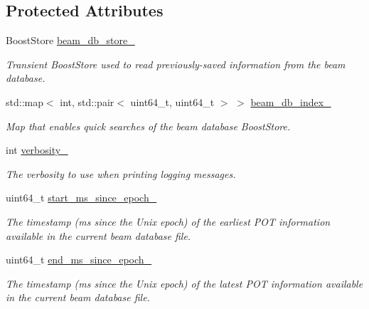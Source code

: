 \subsection*{Protected Attributes}
\begin{DoxyCompactItemize}
\item 
\hypertarget{classBeamChecker_a2b910738f1f07819ce8cf564bff685d0}{
BoostStore \hyperlink{classBeamChecker_a2b910738f1f07819ce8cf564bff685d0}{beam\_\-db\_\-store\_\-}}
\label{classBeamChecker_a2b910738f1f07819ce8cf564bff685d0}

\begin{DoxyCompactList}\small\item\em Transient BoostStore used to read previously-\/saved information from the beam database. \item\end{DoxyCompactList}\item 
std::map$<$ int, std::pair$<$ uint64\_\-t, uint64\_\-t $>$ $>$ \hyperlink{classBeamChecker_aab9b16fbdd8cdea6aa1a77fc2f0ea842}{beam\_\-db\_\-index\_\-}
\begin{DoxyCompactList}\small\item\em Map that enables quick searches of the beam database BoostStore. \item\end{DoxyCompactList}\item 
int \hyperlink{classBeamChecker_aceafb01556c2541a737d4feaab2f757e}{verbosity\_\-}
\begin{DoxyCompactList}\small\item\em The verbosity to use when printing logging messages. \item\end{DoxyCompactList}\item 
\hypertarget{classBeamChecker_acd0db6480aaf42ee431b182a68496c32}{
uint64\_\-t \hyperlink{classBeamChecker_acd0db6480aaf42ee431b182a68496c32}{start\_\-ms\_\-since\_\-epoch\_\-}}
\label{classBeamChecker_acd0db6480aaf42ee431b182a68496c32}

\begin{DoxyCompactList}\small\item\em The timestamp (ms since the Unix epoch) of the earliest POT information available in the current beam database file. \item\end{DoxyCompactList}\item 
\hypertarget{classBeamChecker_abb2801b7c15da8c7ae56f96786d6cb54}{
uint64\_\-t \hyperlink{classBeamChecker_abb2801b7c15da8c7ae56f96786d6cb54}{end\_\-ms\_\-since\_\-epoch\_\-}}
\label{classBeamChecker_abb2801b7c15da8c7ae56f96786d6cb54}

\begin{DoxyCompactList}\small\item\em The timestamp (ms since the Unix epoch) of the latest POT information available in the current beam database file. \item\end{DoxyCompactList}\end{DoxyCompactItemize}


